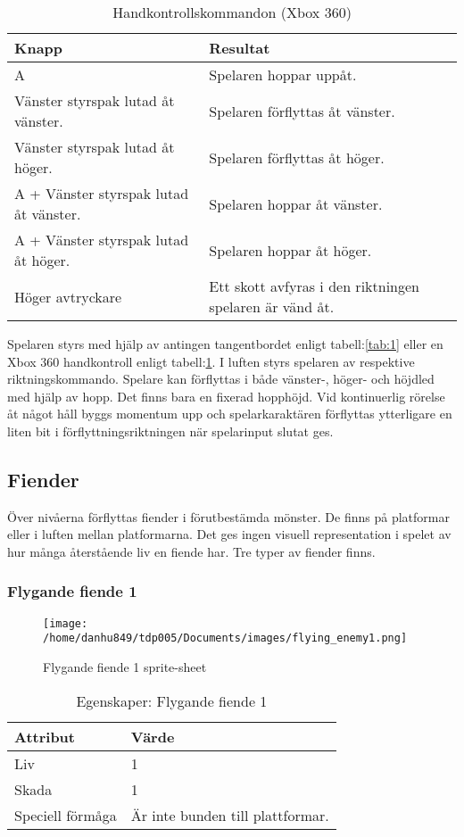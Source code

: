 \documentclass{TDP005mall}
\begin{document}
\begin{table}[h!]
  \caption{Handkontrollskommandon (Xbox 360)\label{tab:2}}
\begin{tabular}{|l|l|}
\hline
Knapp & Resultat \\\hline
A & Spelaren hoppar uppåt. \\\hline
Vänster styrspak lutad åt vänster.  & Spelaren förflyttas åt vänster. \\\hline
Vänster styrspak lutad åt höger. & Spelaren förflyttas åt höger. \\\hline
A + Vänster styrspak lutad åt vänster. & Spelaren hoppar åt vänster. \\\hline
A + Vänster styrspak lutad åt höger. & Spelaren hoppar åt höger. \\\hline
Höger avtryckare & Ett skott avfyras i den riktningen spelaren är vänd åt. \\\hline
\end{tabular}
\end{table}

Spelaren styrs med hjälp av antingen tangentbordet enligt tabell:\ref{tab:1} eller en Xbox 360 handkontroll enligt tabell:\ref{tab:2}. I luften styrs spelaren av respektive riktningskommando. Spelare kan förflyttas i både vänster-, höger- och höjdled med hjälp av hopp. Det finns bara en fixerad hopphöjd. Vid kontinuerlig rörelse åt något håll byggs momentum upp och spelarkaraktären förflyttas ytterligare en liten bit i förflyttningsriktningen när spelarinput slutat ges.

\subsection{Fiender}
Över nivåerna förflyttas fiender i förutbestämda mönster. De finns på platformar eller i luften mellan platformarna. Det ges ingen visuell representation i spelet av hur många återstående liv en fiende har. Tre typer av fiender finns.

\subsubsection*{Flygande fiende 1}
\begin{figure}[h!]
  \caption{Flygande fiende 1 sprite-sheet\label{fig:1}}
  \texttt{[image: /home/danhu849/tdp005/Documents/images/flying\_enemy1.png]}
\end{figure}

\begin{table}[h!]
  \caption{Egenskaper: Flygande fiende 1\label{tab:3}}
\begin{tabular}{|l|l|}
\hline
Attribut & Värde \\\hline
Liv & 1 \\\hline
Skada & 1 \\\hline
Speciell förmåga & Är inte bunden till plattformar. \\\hline
\end{tabular}
\end{table}
\end{document}
